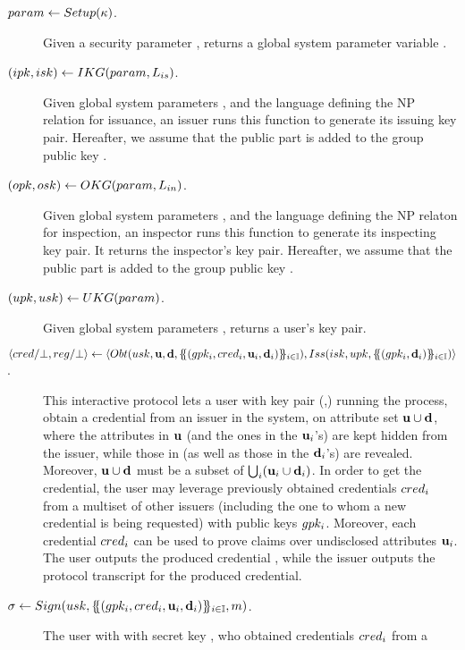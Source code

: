 \begin{description}
\item[$param \gets Setup(\kappa)$.] Given a security parameter \secpar,
  returns a global system parameter variable \parm.
\item[$(ipk,isk) \gets IKG(param,L_{is})$.] Given global system
  parameters \parm, and the language \LangIss defining the NP relation for
  issuance, an issuer runs this function to generate its issuing key pair.
  Hereafter, we assume that the public part \ipk is added to the group public
  key \gpk.
\item[$(opk,osk) \gets OKG(param,L_{in})$.] Given global system
  parameters \parm, and the language \LangIns defining the NP relaton for
  inspection, an inspector runs this function to generate its inspecting key
  pair. It returns the inspector's key pair. Hereafter, we assume that the
  public part \opk is added to the group public key \gpk.
\item[$(upk,usk) \gets UKG(param)$.] Given global system parameters
  \parm, returns a user's key pair.
\item[$\langle cred/\bot,reg/\bot \rangle \gets
  \langle
  Obt(usk,\mathbf{u},\mathbf{d},\{\mskip-5mu\{ (gpk_i,cred_i,\mathbf{u}_i,\mathbf{d}_i)\}\mskip-5mu\}_{i \in \mathbb{I}}),
  Iss(isk,upk,\{\mskip-5mu\{ (gpk_i,\mathbf{d}_i)\}\mskip-5mu\}_{i \in \mathbb{I}})
  \rangle$.] %
  This interactive protocol lets a user with key pair (\upk,\usk) running the
  \Obtain process, obtain a credential \cred from an issuer in the system, on
  attribute set $\mathbf{u} \cup \mathbf{d}$, where the attributes in $\mathbf{u}$ (and
  the ones in the $\mathbf{u}_i$'s) are kept hidden from the issuer, while those in
  \dattrs (as well as those in the $\mathbf{d}_i$'s) are revealed. Moreover,
  $\mathbf{u} \cup \mathbf{d}$ must be a subset of $\bigcup_i (\mathbf{u}_i \cup
  \mathbf{d}_i)$. In order to get the credential, the user may leverage previously
  obtained credentials $cred_i$ from a multiset of other issuers (including the
  one to whom a new credential is being requested) with public keys $gpk_i$.
  Moreover, each credential $cred_i$ can be used to prove claims over
  undisclosed attributes $\mathbf{u}_i$. The user
  outputs the produced credential \cred, while the issuer outputs the protocol
  transcript \utrans for the produced credential.
\item[$\sigma \gets Sign(usk,\{\mskip-5mu\{ (gpk_i,cred_i,\mathbf{u}_i,\mathbf{d}_i)
  \}\mskip-5mu\}_{i \in \mathbb{I}},m)$.] %
  The user with with secret key \usk, who obtained credentials $cred_i$ from a

\end{description}
